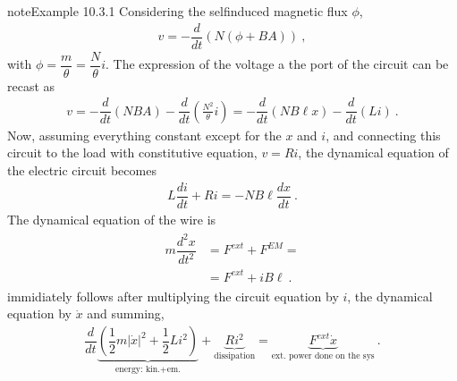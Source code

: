 \documentclass[letterpaper,10pt,english]{jupyterBook}
\begin{document}
\begin{sphinxadmonition}{note}{Example 10.3.1}
\sphinxAtStartPar
{} Considering the self\sphinxhyphen{}induced magnetic flux \(\phi\),
\begin{equation*}
\begin{split}v = - \dfrac{d}{dt} \left( N \left( \phi + B A \right) \right) \ ,\end{split}
\end{equation*}
\sphinxAtStartPar
with \(\phi = \dfrac{m}{\theta} = \dfrac{N}{\theta} i\). The expression of the voltage a the port of the circuit can be recast as
\begin{equation*}
\begin{split}v = - \dfrac{d}{dt} \left( N B A \right) - \dfrac{d}{dt} \left( \frac{N^2}{\theta} i \right) = - \dfrac{d}{dt} \left( N B \ell x \right) - \dfrac{d}{dt} \left( L i \right) \ .\end{split}
\end{equation*}
\sphinxAtStartPar
Now, assuming everything constant except for the \(x\) and \(i\), and connecting this circuit to the load with constitutive equation, \(v = R i\), the dynamical equation of the electric circuit becomes
\begin{equation*}
\begin{split}L \dfrac{d i}{d t} + R i = - N B \ell \dfrac{d x}{d t} \ .\end{split}
\end{equation*}
\sphinxAtStartPar
The dynamical equation of the wire is
\begin{equation*}
\begin{split}\begin{aligned}
 m \dfrac{d^2 x}{d t^2} 
 & = F^{ext} + F^{EM} = \\
 & = F^{ext} + i B \ell \ .
\end{aligned}\end{split}
\end{equation*}
\sphinxAtStartPar
{} immidiately follows after multiplying the circuit equation by \(i\), the dynamical equation by \(\dot{x}\) and summing,
\begin{equation*}
\begin{split}\dfrac{d}{dt} \underbrace{\left( \dfrac{1}{2} m |\dot{x}|^2 + \dfrac{1}{2} L i^2 \right)}_{\text{energy: kin.+em.}} + \underbrace{R i^2}_{\text{dissipation}} = \underbrace{F^{ext} \dot{x}}_{\text{ext. power done on the sys}} \ .\end{split}
\end{equation*}\end{sphinxadmonition}
\end{document}
